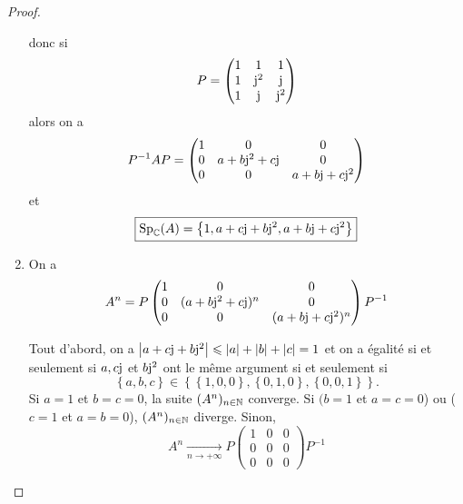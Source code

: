 \documentclass[12pt]{article}
\begin{document}
\begin{proof}
\begin{enumerate}
		donc si 
		\begin{equation}
			P=\begin{pmatrix}
				1&1&1\\ 1&\mathrm{j}^{2}&\mathrm{j}\\1&\mathrm{j}&\mathrm{j}^{2}
			\end{pmatrix}
		\end{equation}
		alors on a 
		\begin{equation}
			P^{-1}AP=\begin{pmatrix}
				1&0&0\\
				0&a+b\mathrm{j}^{2}+c\mathrm{j}&0\\
				0&0&a+b\mathrm{j}+c\mathrm{j}^{2}
			\end{pmatrix}
		\end{equation}
		et 
		\begin{equation}
			\boxed{
				\operatorname{Sp}_{\mathbb{C}}(A)=\left\lbrace1,a+c\mathrm{j}+b\mathrm{j}^{2},a+b\mathrm{j}+c\mathrm{j}^{2}\right\rbrace
			}
		\end{equation}

		\item On a 
		\begin{equation}
			A^{n}=P\begin{pmatrix}
				1&0&0\\
				0&(a+b\mathrm{j}^{2}+c\mathrm{j})^{n}&0\\
				0&0&(a+b\mathrm{j}+c\mathrm{j}^{2})^{n}
			\end{pmatrix}P^{-1}
		\end{equation}

		Tout d'abord, on a $\left\lvert a+c\mathrm{j}+b\mathrm{j}^{2}\right\rvert\leqslant\left\lvert a\right\rvert+\left\lvert b\right\rvert+\left\lvert c\right\rvert=1$ et on a égalité si et seulement si $a,c\mathrm{j}$ et $b\mathrm{j}^{2}$ ont le même argument si et seulement si 
		\begin{equation*}
			\left\lbrace a,b,c\right\rbrace\in\left\lbrace\left\lbrace1,0,0\right\rbrace,\left\lbrace0,1,0\right\rbrace,\left\lbrace0,0,1\right\rbrace\right\rbrace.
		\end{equation*}
		Si $a=1$ et $b=c=0$, la suite $(A^{n})_{n\in\mathbb{N}}$ converge.
		Si $(b=1$ et $a=c=0$) ou ($c=1$ et $a=b=0$), $(A^{n})_{n\in\mathbb{N}}$ diverge.
		Sinon,
		\begin{equation}
			\boxed{
			A^{n}\xrightarrow[n\to+\infty]{}P\begin{pmatrix}
				1&0&0\\0&0&0\\0&0&0
			\end{pmatrix}P^{-1}}
		\end{equation}
	\end{enumerate}
\end{proof}
\end{document}
